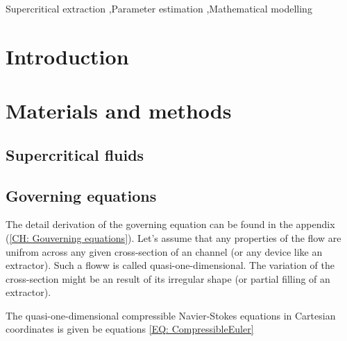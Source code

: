 \documentclass[a4paper,fleqn]{cas-dc}
\begin{document}
\begin{keywords}
Supercritical extraction \sep Parameter estimation \sep Mathematical modelling
\end{keywords}

\maketitle


\section{Introduction}


\section{Materials and methods} \label{CH: Materials and methods}

\subsection{Supercritical fluids} \label{CH: Thermodynamic}


%

\subsection{Governing equations}
The detail derivation of the governing equation can be found in the appendix (\ref{CH: Gouverning equations}). Let's assume that any properties of the flow are unifrom across any given cross-section of an channel (or any device like an extractor). Such a floww is called quasi-one-dimensional. The variation of the cross-section might be an result of its irregular shape (or partial filling of an extractor). 

The quasi-one-dimensional compressible Navier-Stokes equations in Cartesian coordinates is given be equations \ref{EQ: CompressibleEuler}
\end{document}

